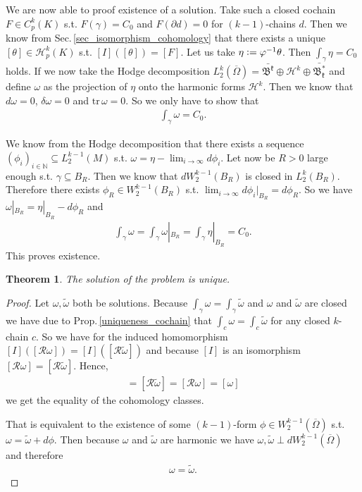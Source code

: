 \documentclass[12pt,a4paper]{article}
\newtheorem{theorem}{Theorem}
\theoremstyle{definition}
\newcommand{\omegabar}{\overline{\Omega}}
\newcommand{\rop}{\mathscr{R}} %
\begin{document}
We are now able to proof existence of a 
solution. Take such a closed cochain $F \in C^k_p(K)$ s.t. $F(\gamma) = C_0$ and 
$F(\partial d) = 0$ for $(k-1)$-chains $d$. Then we know from 
Sec.\,\ref{sec_isomorphism_cohomology} that 
there exists a unique $[\theta] \in \mathscr{H}_p^k(K)$ s.t. 
$[I]([\theta]) = [F]$. Let us take $\eta \vcentcolon= 
\varphi^{-1} \theta$. Then $\int_\gamma \eta = C_0$ holds. If we now take
the Hodge decomposition
$L^k_2(\omegabar) = \bar{\mathfrak{B^k}} \oplus \mathcal{H}^k \oplus
\bar{\mathfrak{B^*_k}}$ and define $\omega$ as the projection of $\eta$ onto the
harmonic forms $\mathcal{H}^k$. Then we know that $d\omega = 0$, 
$\delta\omega = 0$ and $\text{tr}\,\omega = 0$. So we only have to show that
\begin{align*}
\int_\gamma \omega = C_0.
\end{align*}

We know from the Hodge decomposition that there exists a sequence
$(\phi_i)_{i\in \mathbb{N}} \subseteq L^{k-1}_2(M)$ s.t. 
$\omega = \eta - \lim_{i \rightarrow \infty} d\phi_i$.
Let now be $R>0$ large enough s.t. $\gamma \subseteq B_R$. Then we know that
$d W^{k-1}_2(B_R)$ is closed in $L_2^k(B_R)$. \cite{}  Therefore there exists 
$\phi_R \in  W^{k-1}_2(B_R)$ s.t. 
$\lim_{i \rightarrow \infty} d\phi_i|_{B_R} = d\phi_R$. So we have
$\omega|_{B_R} = \eta|_{B_R} - d\phi_R$ and 
\begin{align*}
\int_\gamma \omega = \int_\gamma \omega|_{B_R} = \int_\gamma \eta|_{B_R} = C_0.
\end{align*}
This proves existence.

\begin{theorem}
    The solution of the problem is unique.
\end{theorem}
\begin{proof}
    Let $\omega, \tilde{\omega}$ both be solutions. 
    Because $\int_\gamma \omega = \int_\gamma \tilde{\omega}$ and $\omega$ and
    $\tilde{\omega}$ are closed we have due to Prop.\,\ref{uniqueness_cochain} %
    that $\int_c \omega = \int_c \tilde{\omega}$ for any closed $k$-chain $c$.
    So we have for the induced homomorphism $[I]([\rop \omega]) = 
    [I]([\rop \tilde{\omega}])$ and because $[I]$ is an isomorphism 
    $[\rop \omega] = [\rop \tilde{\omega}]$. Hence,
    \begin{align*}
    [\tilde{\omega}] = [\rop \tilde{\omega}] = 
    [\rop \omega] = [\omega]
    \end{align*}
    we get the equality of the cohomology classes. \par
    
    That is equivalent to the
    existence of some $(k-1)$-form $\phi \in W^{k-1}_2(\omegabar)$ s.t.
    $\omega = \tilde{\omega} + d\phi$. Then because $\omega$ and 
    $\tilde{\omega}$ are harmonic we have 
    $\omega, \tilde{\omega} \perp dW^{k-1}_2(\omegabar)$ and therefore 
    \begin{align*}
    \omega = \tilde{\omega}.
    \end{align*}
\end{proof}
\printbibliography
\end{document}

